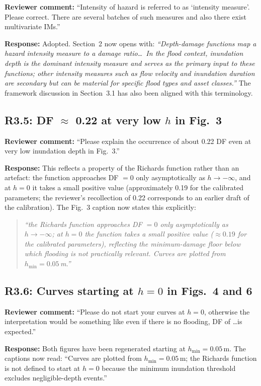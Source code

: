 \documentclass[11pt]{article}
\begin{document}
\textbf{Reviewer comment:} ``Intensity of hazard is referred to as `intensity measure'. Please correct. There are several batches of such measures and also there exist multivariate IMs.''

\textbf{Response:} Adopted. Section~2 now opens with: \textit{``Depth-damage functions map a hazard intensity measure to a damage ratio\ldots\ In the flood context, inundation depth is the dominant intensity measure and serves as the primary input to these functions; other intensity measures such as flow velocity and inundation duration are secondary but can be material for specific flood types and asset classes.''} The framework discussion in Section~3.1 has also been aligned with this terminology.

\subsection*{R3.5: DF $\approx$ 0.22 at very low $h$ in Fig.~3}

\textbf{Reviewer comment:} ``Please explain the occurrence of about 0.22 DF even at very low inundation depth in Fig.~3.''

\textbf{Response:} This reflects a property of the Richards function rather than an artefact: the function approaches DF $= 0$ only asymptotically as $h \to -\infty$, and at $h = 0$ it takes a small positive value (approximately 0.19 for the calibrated parameters; the reviewer's recollection of 0.22 corresponds to an earlier draft of the calibration). The Fig.~3 caption now states this explicitly:
\begin{quote}
\textit{``the Richards function approaches DF $= 0$ only asymptotically as $h \to -\infty$; at $h = 0$ the function takes a small positive value ($\approx 0.19$ for the calibrated parameters), reflecting the minimum-damage floor below which flooding is not practically relevant. Curves are plotted from $h_{\min} = 0.05$\,m.''}
\end{quote}

\subsection*{R3.6: Curves starting at $h = 0$ in Figs.~4 and 6}

\textbf{Reviewer comment:} ``Please do not start your curves at $h = 0$, otherwise the interpretation would be something like even if there is no flooding, DF of \ldots is expected.''

\textbf{Response:} Both figures have been regenerated starting at $h_{\min} = 0.05$\,m. The captions now read: ``Curves are plotted from $h_{\min} = 0.05$\,m; the Richards function is not defined to start at $h = 0$ because the minimum inundation threshold excludes negligible-depth events.''
\end{document}
